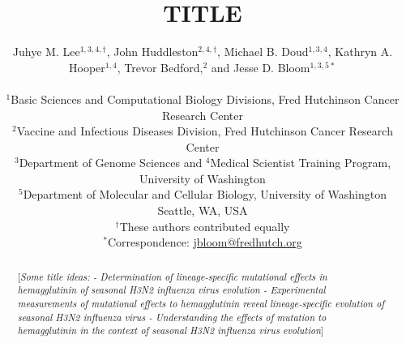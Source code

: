 \documentclass[11pt]{article}
\title{TITLE}
\author
{Juhye M. Lee$^{1,3,4,\dagger}$, John Huddleston$^{2,4,\dagger}$, Michael B. Doud$^{1,3,4}$, Kathryn A. Hooper$^{1,4}$, Trevor Bedford,$^{2}$ and Jesse D. Bloom$^{1,3,5*}$\\
\\
\scriptsize{$^1$Basic Sciences and Computational Biology Divisions, Fred Hutchinson Cancer Research Center}\\
\scriptsize{$^2$Vaccine and Infectious Diseases Division, Fred Hutchinson Cancer Research Center} \\
\scriptsize{$^3$Department of Genome Sciences and $^4$Medical Scientist Training Program, University of Washington} \\
\scriptsize{$^5$Department of Molecular and Cellular Biology, University of Washington} \\
\scriptsize{Seattle, WA, USA} \\
\scriptsize{$^{\dagger}$These authors contributed equally} \\
\scriptsize{$^*$Correspondence: \href{jbloom@fredhutch.org}{jbloom@fredhutch.org}}
}
\date{}
\newcommand{\comment}[1]{{\color{red}[\textsl{#1}]}}
\begin{document}
\maketitle
\onehalfspacing

\begin{abstract}
\comment{Some title ideas:
- Determination of lineage-specific mutational effects in hemagglutinin of seasonal H3N2 influenza virus evolution
- Experimental measurements of mutational effects to hemagglutinin reveal lineage-specific evolution of seasonal H3N2 influenza virus
- Understanding the effects of mutation to hemagglutinin in the context of seasonal H3N2 influenza virus evolution}
\end{abstract}
\end{document}
